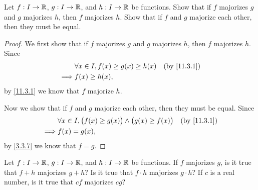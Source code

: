 \exercisesection

\begin{ex}\label{ex:11.3.1}
  Let \(f : I \to \mathbb{R}\), \(g : I \to \mathbb{R}\), and \(h : I \to \mathbb{R}\) be functions.
  Show that if \(f\) majorizes \(g\) and \(g\) majorizes \(h\), then \(f\) majorizes \(h\).
  Show that if \(f\) and \(g\) majorize each other, then they must be equal.
\end{ex}

\begin{proof}
  We first show that if \(f\) majorizes \(g\) and \(g\) majorizes \(h\), then \(f\) majorizes \(h\).
  Since
  \begin{align*}
             & \forall x \in I, f(x) \geq g(x) \geq h(x) &  & \text{(by \cref{11.3.1})} \\
    \implies & f(x) \geq h(x),
  \end{align*}
  by \cref{11.3.1} we know that \(f\) majorize \(h\).

  Now we show that if \(f\) and \(g\) majorize each other, then they must be equal.
  Since
  \begin{align*}
             & \forall x \in I, \big(f(x) \geq g(x)\big) \land \big(g(x) \geq f(x)\big) &  & \text{(by \cref{11.3.1})} \\
    \implies & f(x) = g(x),
  \end{align*}
  by \cref{3.3.7} we know that \(f = g\).
\end{proof}

\begin{ex}\label{ex:11.3.2}
  Let \(f : I \to \mathbb{R}\), \(g : I \to \mathbb{R}\), and \(h : I \to \mathbb{R}\) be functions.
  If \(f\) majorizes \(g\), is it true that \(f + h\) majorizes \(g + h\)?
  Is it true that \(f \cdot h\) majorizes \(g \cdot h\)?
  If \(c\) is a real number, is it true that \(cf\) majorizes \(cg\)?
\end{ex}


